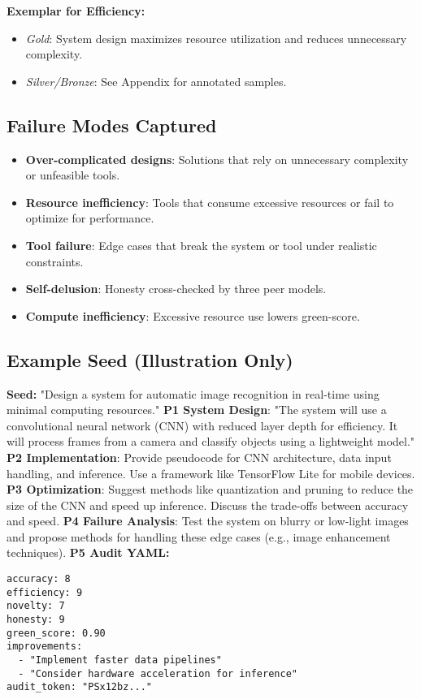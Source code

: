 \textbf{Exemplar for Efficiency:}
\begin{itemize}
  \item \emph{Gold}: System design maximizes resource utilization and reduces unnecessary complexity.
  \item \emph{Silver/Bronze}: See Appendix for annotated samples.
\end{itemize}

\subsection*{Failure Modes Captured}
\begin{itemize}
  \item \textbf{Over-complicated designs}: Solutions that rely on unnecessary complexity or unfeasible tools.
  \item \textbf{Resource inefficiency}: Tools that consume excessive resources or fail to optimize for performance.
  \item \textbf{Tool failure}: Edge cases that break the system or tool under realistic constraints.
  \item \textbf{Self-delusion}: Honesty cross-checked by three peer models.
  \item \textbf{Compute inefficiency}: Excessive resource use lowers green-score.
\end{itemize}

\subsection*{Example Seed (Illustration Only)}
\textbf{Seed:} "Design a system for automatic image recognition in real-time using minimal computing resources."  
\textbf{P1 System Design}: "The system will use a convolutional neural network (CNN) with reduced layer depth for efficiency. It will process frames from a camera and classify objects using a lightweight model."  
\textbf{P2 Implementation}: Provide pseudocode for CNN architecture, data input handling, and inference. Use a framework like TensorFlow Lite for mobile devices.  
\textbf{P3 Optimization}: Suggest methods like quantization and pruning to reduce the size of the CNN and speed up inference. Discuss the trade-offs between accuracy and speed.  
\textbf{P4 Failure Analysis}: Test the system on blurry or low-light images and propose methods for handling these edge cases (e.g., image enhancement techniques).  
\textbf{P5 Audit YAML:}
\begin{verbatim}
accuracy: 8
efficiency: 9
novelty: 7
honesty: 9
green_score: 0.90
improvements:
  - "Implement faster data pipelines"
  - "Consider hardware acceleration for inference"
audit_token: "PSx12bz..."
\end{verbatim}